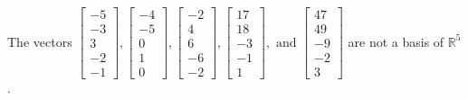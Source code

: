 \begin{exercise}
\begin{exerciseStatement}
  \end{exerciseStatement}
  \begin{exerciseAnswer}
   The vectors \(\left[\begin{array}{r}
-5 \\
-3 \\
3 \\
-2 \\
-1
\end{array}\right] , \left[\begin{array}{r}
-4 \\
-5 \\
0 \\
1 \\
0
\end{array}\right] , \left[\begin{array}{r}
-2 \\
4 \\
6 \\
-6 \\
-2
\end{array}\right] , \left[\begin{array}{r}
17 \\
18 \\
-3 \\
-1 \\
1
\end{array}\right] , \text{ and } \left[\begin{array}{r}
47 \\
49 \\
-9 \\
-2 \\
3
\end{array}\right]\) 
  	 are not  a basis of \(\mathbb{R}^5\).
  


  \end{exerciseAnswer}
\end{exercise}